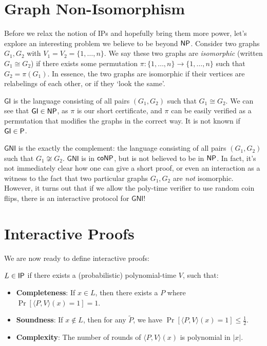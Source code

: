 \documentclass{article}
\begin{document}
\section{Graph Non-Isomorphism}

Before we relax the notion of IPs and hopefully bring them more power, let's explore an interesting problem we believe to be beyond $\mathsf{NP}$.
Consider two graphs $G_1, G_2$ with $V_1 = V_2 = \{1, \ldots, n \}$.
We say these two graphs are \textit{isomorphic} (written $G_1 \cong G_2$) if there exists some permutation $\pi \colon \{1, \ldots, n \} \to \{1, \ldots, n\}$ such that $G_2 = \pi(G_1)$. 
In essence, the two graphs are isomorphic if their vertices are relabelings of each other, or if they `look the same'.

$\textsf{GI}$ is the language consisting of all pairs $(G_1, G_2)$ such that 
$G_1 \cong G_2$. We can see that $\textsf{GI} \in \mathsf{NP}$, as $\pi$ is our short certificate, and $\pi$ can be easily verified as a permutation that modifies the graphs in the correct way. It is not known if $\textsf{GI} \in \mathsf{P}$.

$\textsf{GNI}$ is the exactly the complement: the language consisting of all pairs $(G_1, G_2)$ such that $G_1 \not\cong G_2$. 
$\textsf{GNI}$ is in $\mathsf{coNP}$, but is not believed to be in $\mathsf{NP}$. 
In fact, it's not immediately clear how one can give a short proof, or even an interaction as a witness to the fact that two particular graphs $G_1, G_2$ are \textit{not} isomorphic. 
However, it turns out that if we allow the poly-time verifier to use random coin flips, there is an interactive protocol for $\textsf{GNI}$!

\section{Interactive Proofs}

We are now ready to define interactive proofs:

\begin{definition}
    $L \in \mathsf{IP}$ if there exists a (probabilistic) polynomial-time $V$, such that:
    \begin{itemize}
        \item \textbf{Completeness}: If $x \in L$, then there exists a $P$ where $\Pr[\langle P, V \rangle(x) = 1] = 1$.
        \item \textbf{Soundness}: If $x \notin L$, then for any $\tilde{P}$, we have $\Pr[\langle P, V \rangle(x) = 1] \leq \frac12$.
        \item \textbf{Complexity}: The number of rounds of $\langle P, V \rangle(x)$ is polynomial in $|x|$.
    \end{itemize}
\end{definition}
\end{document}
